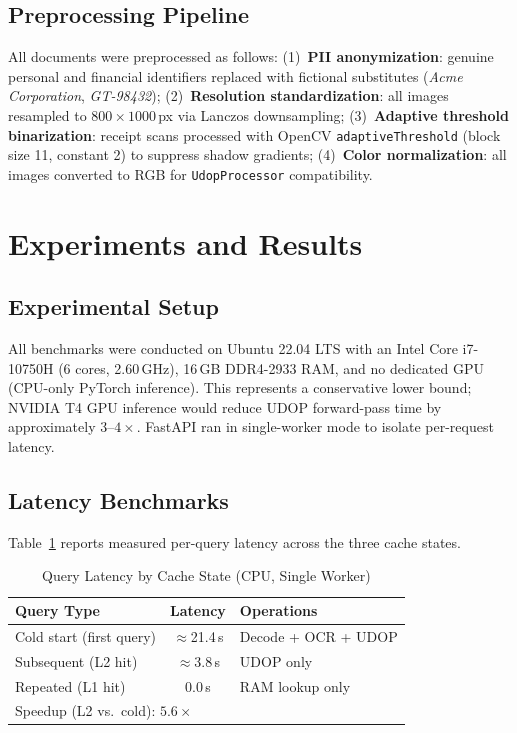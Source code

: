 \documentclass[conference]{IEEEtran}
\begin{document}
\subsection{Preprocessing Pipeline}

All documents were preprocessed as follows:
(1)~\textbf{PII anonymization}: genuine personal and financial identifiers
replaced with fictional substitutes (\emph{Acme Corporation},
\emph{GT-98432});
(2)~\textbf{Resolution standardization}: all images resampled to
$800{\times}1000$\,px via Lanczos downsampling;
(3)~\textbf{Adaptive threshold binarization}: receipt scans processed with
OpenCV \texttt{adaptiveThreshold} (block size 11, constant 2) to suppress
shadow gradients;
(4)~\textbf{Color normalization}: all images converted to RGB for
\texttt{UdopProcessor} compatibility.

\section{Experiments and Results}
\label{sec:experiments}

\subsection{Experimental Setup}

All benchmarks were conducted on Ubuntu 22.04 LTS with an Intel Core
i7-10750H (6 cores, 2.60\,GHz), 16\,GB DDR4-2933 RAM, and no dedicated GPU
(CPU-only PyTorch inference). This represents a conservative lower bound;
NVIDIA T4 GPU inference would reduce UDOP forward-pass time by approximately
$3\text{--}4\times$. FastAPI ran in single-worker mode to isolate per-request
latency.

\subsection{Latency Benchmarks}

Table~\ref{tab:latency} reports measured per-query latency across the three
cache states.

\begin{table}[t]
\caption{Query Latency by Cache State (CPU, Single Worker)}
\label{tab:latency}
\begin{center}
\renewcommand{\arraystretch}{1.2}
\begin{tabular}{|l|c|l|}
\hline
\textbf{Query Type} & \textbf{Latency} & \textbf{Operations} \\
\hline
Cold start (first query)   & ${\approx}$21.4\,s & Decode + OCR + UDOP \\
\hline
Subsequent (L2 hit)        & ${\approx}$3.8\,s  & UDOP only           \\
\hline
Repeated (L1 hit)          & 0.0\,s             & RAM lookup only     \\
\hline
\multicolumn{3}{l}{\footnotesize Speedup (L2 vs.\ cold): $\mathbf{5.6\times}$} \\
\end{tabular}
\end{center}
\end{table}
\end{document}
